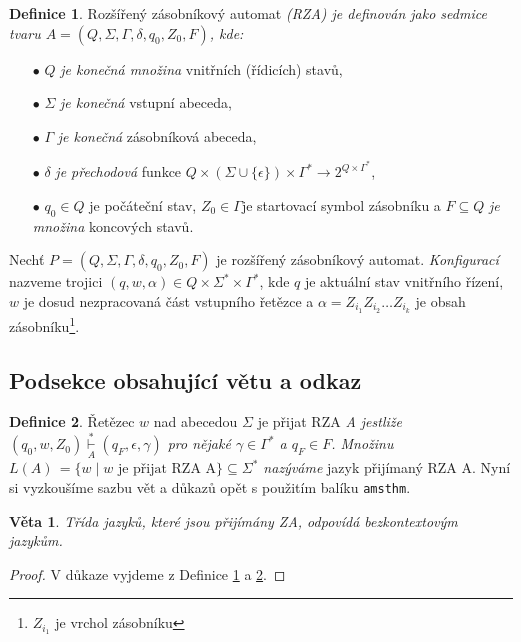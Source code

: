 \documentclass[a4paper,twocolumn,11pt]{article}
\theoremstyle{definition}
\newtheorem{definition}{Definice}
\theoremstyle{plain}
\newtheorem{sentence}{Věta}
\begin{document}
\begin{definition}
\label{definition:1}
Rozšířený zásobníkový automat \textsl{(RZA) 
je de\-finován jako sedmice tvaru $A = (Q, \Sigma, \Gamma, \delta, q_{0}, Z_0,F)$,
kde:}
\begin{itemize}
    \item[$\bullet$]{$Q$ \emph{je konečná množina} vnitřních (řídicích) stavů,}
    \item[$\bullet$]{$\Sigma$ \emph{je konečná} vstupní abeceda,}
    \item[$\bullet$]{$\Gamma$ \emph{je konečná} zásobníková abeceda,}
    \item[$\bullet$]{$\delta$ \emph{je přechodová} funkce $Q\times(\Sigma\cup\{\epsilon\})\times\Gamma^*\rightarrow2^{Q\times\Gamma^*}$,}
    \item[$\bullet$]{$q_{0}\in Q$ je počáteční stav, $Z_0\in\Gamma$je startovací symbol zásobníku a $F\subseteq Q$ \emph{je množina} koncových stavů.}
\end{itemize}


Nechť  $P = (Q, \Sigma, \Gamma, \delta, q_{0}, Z_0,F)$ je rozšířený zásob\-níkový automat. \emph{Konfigurací} nazveme trojici $(q,w,\alpha)\in Q \times \Sigma^* \times\Gamma^*$, 
kde $q$ je aktuální stav vnitřního řízení,
$w$ je dosud nezpracovaná část vstupního řetězce a 
$\alpha = Z_{i_{1}} Z_{i_{2}} \dots Z_{i_{k}}$ 
je obsah zásobníku\footnote{$Z_{i_{1}}$ je vrchol zásobníku}.
\end{definition}

\subsection{Podsekce obsahující větu a odkaz}
    \begin{definition}
    \label{definition:2}
        Řetězec $w$ nad abecedou $\Sigma$ je přijat RZA
        \emph{A jestliže $(q_0,w,Z_0)\overset{*}{\underset{A}{\vdash}} (q_F,\epsilon,\gamma)$ 
        pro nějaké $\gamma\in\Gamma^*$ a $q_F \in F$. 
        Množinu $L(A)\,=\{ w \mid w\mbox{ je přijat RZA A} \} \subseteq \Sigma^*$ nazýváme} jazyk přijímaný RZA A.
        \newpage
        Nyní si vyzkoušíme sazbu vět a důkazů opět s použitím
        balíku \texttt{amsthm}.
         \end{definition}
    \begin{sentence}
        Třída jazyků, které jsou přijímány ZA, odpovídá
        \textnormal{bezkontextovým jazykům.}
    \end{sentence}
    \begin{proof}
        V důkaze vyjdeme z Definice \ref{definition:1} a \ref{definition:2}.
    \end{proof}
    
\end{document}
